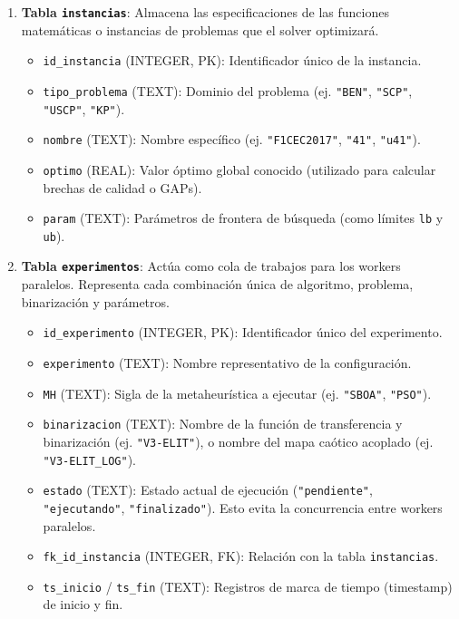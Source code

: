 \begin{enumerate}
    \item \textbf{Tabla \texttt{instancias}}:
    Almacena las especificaciones de las funciones matemáticas o instancias de problemas que el solver optimizará.
    \begin{itemize}
        \item \texttt{id\_instancia} (INTEGER, PK): Identificador único de la instancia.
        \item \texttt{tipo\_problema} (TEXT): Dominio del problema (ej. \texttt{"BEN"}, \texttt{"SCP"}, \texttt{"USCP"}, \texttt{"KP"}).
        \item \texttt{nombre} (TEXT): Nombre específico (ej. \texttt{"F1CEC2017"}, \texttt{"41"}, \texttt{"u41"}).
        \item \texttt{optimo} (REAL): Valor óptimo global conocido (utilizado para calcular brechas de calidad o GAPs).
        \item \texttt{param} (TEXT): Parámetros de frontera de búsqueda (como límites \texttt{lb} y \texttt{ub}).
    \end{itemize}

    \item \textbf{Tabla \texttt{experimentos}}:
    Actúa como cola de trabajos para los workers paralelos. Representa cada combinación única de algoritmo, problema, binarización y parámetros.
    \begin{itemize}
        \item \texttt{id\_experimento} (INTEGER, PK): Identificador único del experimento.
        \item \texttt{experimento} (TEXT): Nombre representativo de la configuración.
        \item \texttt{MH} (TEXT): Sigla de la metaheurística a ejecutar (ej. \texttt{"SBOA"}, \texttt{"PSO"}).
        \item \texttt{binarizacion} (TEXT): Nombre de la función de transferencia y binarización (ej. \texttt{"V3-ELIT"}), o nombre del mapa caótico acoplado (ej. \texttt{"V3-ELIT\_LOG"}).
        \item \texttt{estado} (TEXT): Estado actual de ejecución (\texttt{"pendiente"}, \texttt{"ejecutando"}, \texttt{"finalizado"}). Esto evita la concurrencia entre workers paralelos.
        \item \texttt{fk\_id\_instancia} (INTEGER, FK): Relación con la tabla \texttt{instancias}.
        \item \texttt{ts\_inicio} / \texttt{ts\_fin} (TEXT): Registros de marca de tiempo (timestamp) de inicio y fin.
    \end{itemize}


\end{enumerate}
